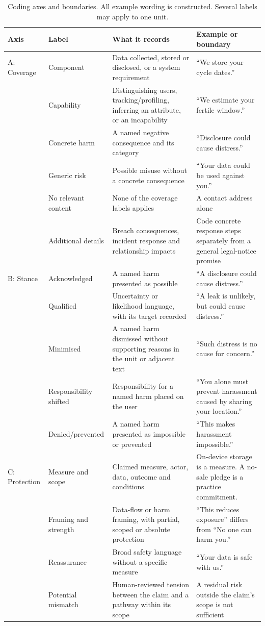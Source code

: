 \documentclass[sigconf,nonacm,natbib=false]{acmart}
\begin{document}
\begin{table}[t]
\caption{Coding axes and boundaries. All example wording is constructed.
Several labels may apply to one unit.}
\label{tab:axes}
\small
\begin{tabular}{@{}L{1.9cm}L{3.3cm}L{6.0cm}L{5.5cm}@{}}
\toprule
\textbf{Axis} & \textbf{Label} & \textbf{What it records} & \textbf{Example or boundary} \\
\midrule
A: Coverage & Component & Data collected, stored or disclosed, or a system requirement
  & \enquote{We store your cycle dates.} \\
 & Capability & Distinguishing users, tracking/profiling, inferring an attribute, or an incapability
  & \enquote{We estimate your fertile window.} \\
 & Concrete harm & A named negative consequence and its category
  & \enquote{Disclosure could cause distress.} \\
 & Generic risk & Possible misuse without a concrete consequence
  & \enquote{Your data could be used against you.} \\
 & No relevant content & None of the coverage labels applies
  & A contact address alone \\
 & Additional details & Breach consequences, incident response and relationship impacts
  & Code concrete response steps separately from a general legal-notice promise \\
\midrule
B: Stance & Acknowledged & A named harm presented as possible
  & \enquote{A disclosure could cause distress.} \\
 & Qualified & Uncertainty or likelihood language, with its target recorded
  & \enquote{A leak is unlikely, but could cause distress.} \\
 & Minimised & A named harm dismissed without supporting reasons in the unit or adjacent text
  & \enquote{Such distress is no cause for concern.} \\
 & Responsibility shifted & Responsibility for a named harm placed on the user
  & \enquote{You alone must prevent harassment caused by sharing your location.} \\
 & Denied/prevented & A named harm presented as impossible or prevented
  & \enquote{This makes harassment impossible.} \\
\midrule
C: Protection & Measure and scope & Claimed measure, actor, data, outcome and conditions
  & On-device storage is a measure. A no-sale pledge is a practice commitment. \\
 & Framing and strength & Data-flow or harm framing, with partial, scoped or absolute protection
  & \enquote{This reduces exposure} differs from \enquote{No one can harm you.} \\
 & Reassurance & Broad safety language without a specific measure
  & \enquote{Your data is safe with us.} \\
 & Potential mismatch & Human-reviewed tension between the claim and a pathway within its scope
  & A residual risk outside the claim's scope is not sufficient \\
\bottomrule
\end{tabular}
\end{table}
\end{document}
